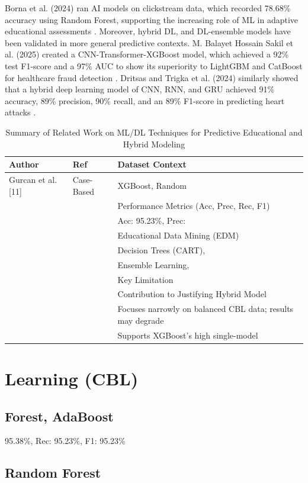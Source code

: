 \documentclass[twocolumn]{svjour3}
\begin{document}
Borna et al. (2024) ran AI models on clickstream data, which recorded 78.68\% accuracy using Random Forest, supporting the increasing role of ML in adaptive educational assessments \cite{22}. Moreover, hybrid DL, and DL-ensemble models have been validated in more general predictive contexts. M. Balayet Hossain Sakil et al. (2025) created a CNN-Transformer-XGBoost model, which achieved a 92\% test F1-score and a 97\% AUC to show its superiority to LightGBM and CatBoost for healthcare fraud detection \cite{23}. Dritsas and Trigka et al. (2024) similarly showed that a hybrid deep learning model of CNN, RNN, and GRU achieved 91\% accuracy, 89\% precision, 90\% recall, and an 89\% F1-score in predicting heart attacks \cite{24}.
\begin{table}[htbp]
\centering
\caption{Summary of Related Work on ML/DL Techniques for Predictive Educational and Hybrid Modeling}
\label{tab:1}
\begin{tabular}{lll}
\hline
Author & Ref & Dataset Context \\
\hline
Gurcan et al. [11] & Case-Based & XGBoost, Random \\
& & Performance Metrics (Acc, Prec, Rec, F1) \\
& & Acc: 95.23\%, Prec: \\
& & Educational Data Mining (EDM) \\
& & Decision Trees (CART), \\
& & Ensemble Learning, \\
& & Key Limitation \\
& & Contribution to Justifying Hybrid Model \\
& & Focuses narrowly on balanced CBL data; results may degrade \\
& & Supports XGBoost's high single-model \\
\hline
\end{tabular}
\end{table}

\section{Learning (CBL)}
\subsection{Forest, AdaBoost}
95.38\%, Rec: 95.23\%, F1: 95.23\%
\subsection{Random Forest}
\end{document}
